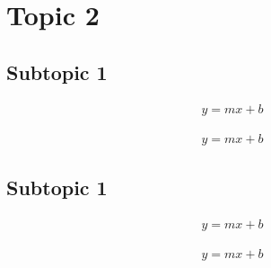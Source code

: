 \documentclass[a4paper, english, 12pt]{article}
\begin{document}
        \section{Topic 2}
        \begin{paracol}{2}
            
            \begin{fleqn}
                \subsection{Subtopic 1}
                
                \begin{align*}
                    y = mx + b
                \end{align*}



                \begin{align*}
                    y = mx + b
                \end{align*}



                \newpage
                \switchcolumn

                \subsection{Subtopic 1}

                \begin{align*}
                    y = mx + b
                \end{align*}


                \begin{align*}
                    y = mx + b
                \end{align*}



                
            \end{fleqn}
        \end{paracol}
\end{document}
